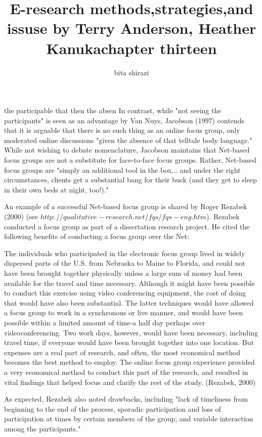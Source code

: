 \documentclass{beamer}
\title{E-research methods,strategies,and issuse by Terry Anderson, Heather Kanuka}
\author{bita shirazi}
\begin{document}
  {%
    \frame{\titlepage}
  }

  \begin{frame}
\title{chapter thirteen}

the participable that then the absen
In contrast, while "not seeing the participants" is seen as an advantage by Van Nuys, Jacobson (1997) contends that it is arguable that there is no such thing as an online focus group, only moderated online discussions "given the absence of that telltale body language." While not wishing to debate nomenclature, Jacobson maintains that Net-based focus groups are not a substitute for face-to-face focus groups. Rather, Net-based focus groups are "simply an additional tool in the box... and under the right circumstances, clients get a substantial bang for their buck (and they get to sleep in their own beds at night, too!)."

An example of a successful Net-based focus group is shared by Roger Rezabek (2000) (see  $ http://qualitative-research.net/fqs/fqs-eng.htm$). Rezabek conducted a focus group as part of a dissertation research project. He cited the following benefits of conducting a focus group over the Net:

	The individuals who participated in the electronic focus group lived in widely dispersed parts of the U.S. from Nebraska to Maine to Florida, and could not have been brought together physically unless a large sum of money had been available for the travel and time necessary. Although it might have been possible to conduct this exercise using video conferencing equipment, the cost of doing that would have also been substantial. The latter techniques would have allowed a focus group to work in a synchronous or live manner, and would have been possible within a limited amount of time-a half day perhaps over videoconferencing. Two work days, however, would have been necessary, including travel time, if everyone would have been brought together into one location. But expenses are a real part of research, and often, the most economical method becomes the best method to employ. The online focus group experience provided a very economical method to conduct this part of the research, and resulted in vital findings that helped focus and clarify the rest of the study. (Rezabek, 2000)


As expected, Rezabek also noted drawbacks, including "lack of timeliness from beginning to the end of the process, sporadic participation and loss of participation at times by certain members of the group, and variable interaction among the participants."


\end{frame}
\end{document}
